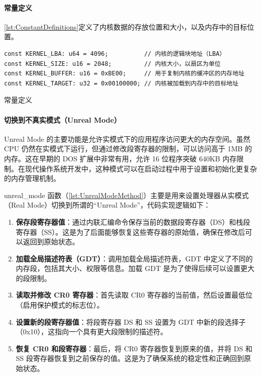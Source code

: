 \paragraph{常量定义}

\cref{lst:ConstantDefinitions}定义了内核数据的存放位置和大小，以及内存中的目标位置。

\begin{listing}[htbp]
    \begin{verbatim}
const KERNEL_LBA: u64 = 4096;          // 内核的逻辑块地址（LBA）
const KERNEL_SIZE: u16 = 2048;         // 内核大小，以扇区为单位
const KERNEL_BUFFER: u16 = 0xBE00;     // 用于复制内核的缓冲区的内存地址
const KERNEL_TARGET: u32 = 0x00100000; // 内核被加载到内存中的目标地址
    \end{verbatim}
    \caption{常量定义}\label{lst:ConstantDefinitions}
\end{listing}

\paragraph{切换到不真实模式（Unreal Mode）}

Unreal Mode 的主要功能是允许实模式下的应用程序访问更大的内存空间。虽然 CPU 仍然在实模式下运行，但通过修改段寄存器的限制，可以访问高于 1MB 的内存。这在早期的 DOS 扩展中非常有用，允许 16 位程序突破 640KB 内存限制。在现代操作系统开发中，这种模式可以在启动过程中用于设置和初始化更复杂的内存管理机制。

unreal\_mode 函数（\cref{lst:UnrealModeMethod}）主要是用来设置处理器从实模式（Real Mode）切换到所谓的“Unreal Mode”，代码实现逻辑如下：

\begin{enumerate}
    \item \textbf{保存段寄存器值}：通过内联汇编命令保存当前的数据段寄存器（DS）和栈段寄存器（SS）。这是为了后面能够恢复这些寄存器的原始值，确保在修改后可以返回到原始状态。
    \item \textbf{加载全局描述符表（GDT）}：调用加载全局描述符表，GDT 中定义了不同的内存段，包括其大小、权限等信息。加载 GDT 是为了使得后续可以设置更大的段限制。
    \item \textbf{读取并修改 CR0 寄存器}：首先读取 CR0 寄存器的当前值，然后设置最低位（启用保护模式的标志位）。
    \item \textbf{设置新的段寄存器值}：将段寄存器 DS 和 SS 设置为 GDT 中新的段选择子（0x10），这指向一个具有更大段限制的描述符。
    \item \textbf{恢复 CR0 和段寄存器}：最后，将 CR0 寄存器恢复到原来的值，并将 DS 和 SS 段寄存器恢复到之前保存的值。这是为了确保系统的稳定性和正确回到原始状态。
\end{enumerate}

